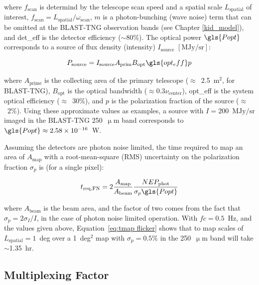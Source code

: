 where $f_{\mathrm{scan}}$ is determind by the telescope scan speed and a spatial scale $L_{\mathrm{spatial}}$ of interest, $f_{\mathrm{scan}} = L_{\mathrm{spatial}} / \omega_{\mathrm{scan}}$, $m$ is a photon-bunching (wave noise) term that can be omitted at the BLAST-TNG observation bands (see Chapter \ref{kid_model}), and \gls{det_eff} is the detector efficiency ($\sim$80\%). The optical power $\gls{Popt}$ corresponds to a source of flux density (intensity) $I_{\mathrm{source}}$ $[\mathrm{MJy}/\mathrm{sr}]$:

\begin{equation}
  P_{\mathrm{source}} = I_{\mathrm{source}} A_{\mathrm{prim}} B_{\mathrm{opt}} \gls{opt_eff} p
\end{equation}

where $A_{\mathrm{prime}}$ is the collecting area of the primary telescope ($\approx$~2.5~m$^{2}$, for BLAST-TNG), $B_{\mathrm{opt}}$ is the optical bandwidth ($\approx 0.3 \nu_{\mathrm{center}}$), \gls{opt_eff} is the system optical efficiency ($\approx$~30\%), and $p$ is the polarization fraction of the source ($\approx$~2\%). Using these approximate values as examples, a source with $I = 200$~$\mathrm{MJy}/\mathrm{sr}$ imaged in the BLAST-TNG 250~$\upmu$m band corresponds to $\gls{Popt} \approx 2.58 \times 10^{-16}$~W.

Assuming the detectors are photon noise limited, the time required to map an area of $A_{\mathrm{map}}$ with a root-mean-square (RMS) uncertainty on the polarization fraction $\sigma_{p}$ is (for a single pixel):

\begin{equation}\label{eq:tmap flicker}
  t_{\mathrm{req},\mathrm{FN}} = 2 \frac{A_{\mathrm{map}}}{A_{\mathrm{beam}}} \frac{NEP_{\mathrm{phot}}}{\sigma_{p}\gls{Popt}}
\end{equation}

where $A_{\mathrm{beam}}$ is the beam area, and the factor of two comes from the fact that $\sigma_{p} = 2 \sigma_{I} / I$, in the case of photon noise limited operation. With $fc = 0.5$~Hz, and the values given above, Equation~\ref{eq:tmap flicker} shows that to map scales of $L_{\mathrm{spatial}} = 1$~deg over a 1~deg$^{2}$ map with $\sigma_{p} = 0.5$\% in the 250~$\upmu$m band will take $\sim$1.35~hr.

\subsection{Multiplexing Factor}\label{multiplexing}

